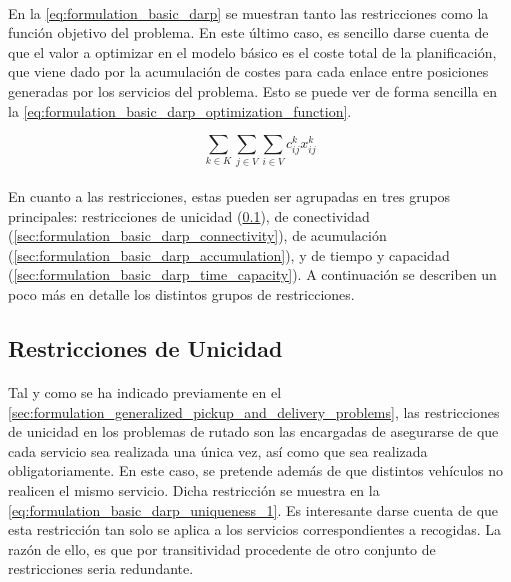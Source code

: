 \documentclass{subfiles}
\begin{document}
      \paragraph{}
      En la \cref{eq:formulation_basic_darp} se muestran tanto las restricciones como la función objetivo del problema. En este último caso, es sencillo darse cuenta de que el valor a optimizar en el modelo básico es el coste total de la planificación, que viene dado por la acumulación de costes para cada enlace entre posiciones generadas por los servicios del problema. Esto se puede ver de forma sencilla en la \cref{eq:formulation_basic_darp_optimization_function}.

      \begin{equation}
      \label{eq:formulation_basic_darp_optimization_function}
        \displaystyle\sum\limits_{k \in K}\sum\limits_{j \in V}\sum\limits_{i \in V}  c_{ij}^{k}x_{ij}^{k}
      \end{equation}

      \paragraph{}
      En cuanto a las restricciones, estas pueden ser agrupadas en tres grupos principales: restricciones de unicidad (\cref{sec:formulation_basic_darp_uniqueness}), de conectividad (\cref{sec:formulation_basic_darp_connectivity}), de acumulación (\cref{sec:formulation_basic_darp_accumulation}), y de tiempo y capacidad (\cref{sec:formulation_basic_darp_time_capacity}). A continuación se describen un poco más en detalle los distintos grupos de restricciones.

      \subsection{Restricciones de Unicidad}
      \label{sec:formulation_basic_darp_uniqueness}

        \paragraph{}
        Tal y como se ha indicado previamente en el \cref{sec:formulation_generalized_pickup_and_delivery_problems}, las restricciones de unicidad en los problemas de rutado son las encargadas de asegurarse de que cada servicio sea realizada una única vez, así como que sea realizada obligatoriamente. En este caso, se pretende además de que distintos vehículos no realicen el mismo servicio. Dicha restricción se muestra en la \cref{eq:formulation_basic_darp_uniqueness_1}. Es interesante darse cuenta de que esta restricción tan solo se aplica a los servicios correspondientes a recogidas. La razón de ello, es que por transitividad procedente de otro conjunto de restricciones seria redundante.
\end{document}
